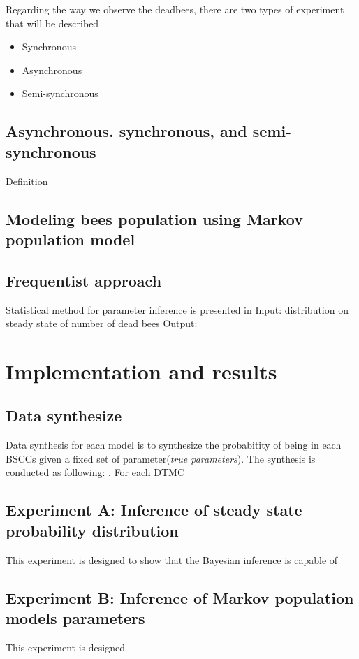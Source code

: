 \documentclass[12pt]{article}
\begin{document}
Regarding the way we observe the deadbees, there are two types of experiment
that will be described
\begin{itemize}
\item Synchronous
\item Asynchronous
\item Semi-synchronous
\end{itemize}

\subsection{Asynchronous. synchronous, and semi-synchronous}
Definition

\subsection{Modeling bees population using Markov population model}

\subsection{Frequentist approach}
Statistical method for parameter inference is presented in \cite{hajnal2019data}
Input: distribution on steady state of number of dead bees Output:

\section{Implementation and results}
\subsection{Data synthesize}
Data synthesis for each model is to synthesize the probabitity of being in each
BSCCs given a fixed set of parameter(\textit{true parameters}). The synthesis is
conducted as following:
. For each DTMC


\subsection{Experiment A: Inference of steady state probability distribution}
This experiment is designed to show that the Bayesian inference is capable of 

\subsection{Experiment B: Inference of Markov population models parameters}
This experiment is designed
\end{document}
